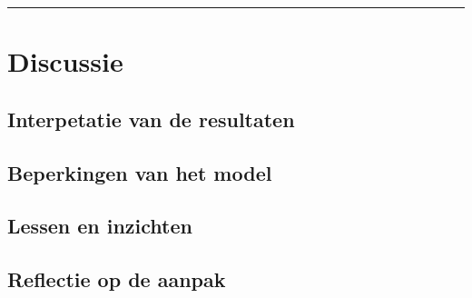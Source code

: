 \vspace{0.2cm}
{\color{gray}\hrule}
\section{Discussie}



\subsection{Interpetatie van de resultaten}

\subsection{Beperkingen van het model}

\subsection{Lessen en inzichten}

\subsection{Reflectie op de aanpak}


